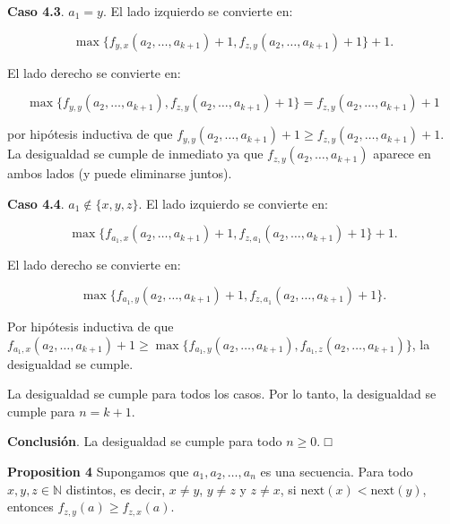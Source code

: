 \documentclass{article}
\begin{document}
\textbf{Caso 4.3}. $a_1 = y$. El lado izquierdo se convierte en:

$$
\max \{f_{y,x}(a_2, \ldots, a_{k+1}) + 1, f_{z,y}(a_2, \ldots, a_{k+1}) + 1\} + 1.
$$


El lado derecho se convierte en:

$$
\max \{f_{y,y}(a_2, \ldots, a_{k+1}), f_{z,y}(a_2, \ldots, a_{k+1}) + 1\} = f_{z,y}(a_2, \ldots, a_{k+1}) + 1
$$


por hipótesis inductiva de que $f_{y,y}(a_2, \ldots, a_{k+1}) + 1 \geq f_{z,y}(a_2, \ldots, a_{k+1}) + 1$. La desigualdad se cumple de inmediato ya que $f_{z,y}(a_2, \ldots, a_{k+1})$ aparece en ambos lados (y puede eliminarse juntos).

\textbf{Caso 4.4}. $a_1 \notin \{x,y,z\}$. El lado izquierdo se convierte en:

$$
\max \{f_{a_1,x}(a_2, \ldots, a_{k+1}) + 1, f_{z,a_1}(a_2, \ldots, a_{k+1}) + 1\} + 1.
$$


El lado derecho se convierte en:

$$
\max \{f_{a_1,y}(a_2, \ldots, a_{k+1}) + 1, f_{z,a_1}(a_2, \ldots, a_{k+1}) + 1\}.
$$


Por hipótesis inductiva de que $f_{a_1,x}(a_2, \ldots, a_{k+1}) + 1 \geq \max \{f_{a_1,y}(a_2, \ldots, a_{k+1}), f_{a_1,z}(a_2, \ldots, a_{k+1})\}$, la desigualdad se cumple.

La desigualdad se cumple para todos los casos. Por lo tanto, la desigualdad se cumple para $n = k+1$.

\textbf{Conclusión}. La desigualdad se cumple para todo $n \geq 0$. □





\large\textbf{Proposition 4}
Supongamos que $a_1, a_2, \ldots, a_n$ es una secuencia. Para todo $x, y, z \in \mathbb{N}$ distintos, es decir, $x \neq y$, $y \neq z$ y $z \neq x$, si $\text{next}(x) < \text{next}(y)$, entonces $f_{z,y}(a) \geq f_{z,x}(a)$.
\end{document}
